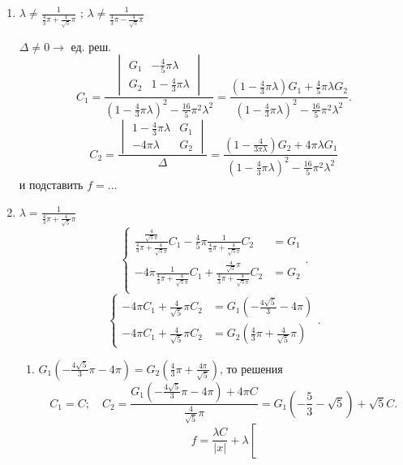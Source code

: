 \documentclass[a4paper]{article}
\begin{document}
\begin{enumerate}
	\item $\lambda \neq \frac{1}{\frac{4}{3}\pi + \frac{4}{\sqrt{5} }\pi}$ ; $\lambda \neq \frac{1}{\frac{4}{3}\pi - \frac{4}{\sqrt{5} }\pi}$

		$\Delta \neq 0\to $  ед. реш.
\[
	C_1 = \frac{\begin{vmatrix}G_1 & - \frac{4}{5} \pi \lambda \\
	G_2 & 1 - \frac{4}{3 }\pi \lambda\end{vmatrix}}{\left(1-\frac{4}{3}
\pi \lambda\right)^2- \frac{16}{5}\pi^2 \lambda^2}=
\frac{\left( 1 - \frac{4}{3 }\pi \lambda \right) G_1+
\frac{4}{5}\pi\lambda G_2}{\left( 1- \frac{4}{3}\pi\lambda \right) ^2
-\frac{16}{5}\pi^2 \lambda^2}
.\] 
\[
	C_2= \frac{\begin{vmatrix}1- \frac{4}{3} \pi\lambda & G_1\\
	-4\pi\lambda & G_2\end{vmatrix} }{\Delta}=
	\frac{\left( 1 - \frac{4}{3 \pi \lambda} \right) G_2+
	4 \pi \lambda G_1}{\left( 1 - \frac{4}{3}\pi\lambda \right) ^2-\frac{16}{5} \pi^2 \lambda^2}
\]
и подставить $f = \ldots$
\item $\lambda = \frac{1}{\frac{4}{3}\pi + \frac{4}{\sqrt{5} }\pi}$ 
\[
\left\{
\begin{aligned}
\frac{\frac{4}{\sqrt{5} \pi}}{\frac{4}{3}\pi+\frac{4}{\sqrt{5} \pi}}C_1
- \frac{4}{5} \pi \frac{1}{\frac{4}{3}\pi + \frac{4}{\sqrt{5} \pi}}C_2&=G_1\\
-4 \pi \frac{1}{\frac{4}{3}\pi + \frac{4}{\sqrt{5} \pi}}C_1+
\frac{\frac{4}{\sqrt{5} }\pi}{\frac{4}{3}\pi+ \frac{4}{\sqrt{5} \pi}}C_2&= G_2 \\
\end{aligned}
\right.
.\]
\[
\left\{
\begin{aligned}
	- 4 \pi C_1+\frac{4}{\sqrt{5} }\pi C_2 &= G_1\left( - \frac{
	4 \sqrt{5} }{3}- 4 \pi \right) \\
	- 4 \pi C_1 + \frac{4}{\sqrt{5} }\pi C_2&= G_2 \left( \frac{4}{3}
	\pi+ \frac{4}{\sqrt{5} }\pi\right) 
\end{aligned}
\right.
.\] 
\begin{enumerate}
	\item $
		G_1\left( - \frac{4\sqrt{5} }{3}\pi- 4 \pi \right) 	= G_2 \left( \frac{4}{3} \pi + \frac{4 \pi}{\sqrt{5} } \right)
	$, то решения
\[
	C_1=C; \quad C_2 = \frac{G_1 \left( - \frac{4 \sqrt{5} }{3}\pi- 4 \pi  \right) +4\pi C}{\frac{4}{\sqrt{5}}\pi}=
	G_1 \left(-\frac{5}{3}-\sqrt{5} \right) +\sqrt{5} C
.\] 
\[
f = \frac{\lambda C}{|x|}+ \lambda \left[ 
\]
\end{enumerate}
\end{enumerate}
\end{document}
